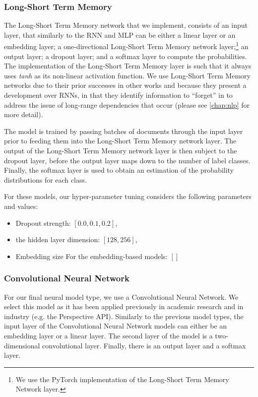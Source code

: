 \subsubsection{Long-Short Term Memory}

The Long-Short Term Memory network that we implement, consists of an input layer, that similarly to the RNN and MLP can be either a linear layer or an embedding layer; a one-directional Long-Short Term Memory network layer;\footnote{We use the PyTorch implementation of the Long-Short Term Memory Network layer.} an output layer; a dropout layer; and a softmax layer to compute the probabilities. The implementation of the Long-Short Term Memory layer is such that it always uses \textit{tanh} as its non-linear activation function. We use Long-Short Term Memory networks due to their prior successes in other works \cite{CITE: LSTM papers} and because they present a development over RNNs, in that they identify information to ``forget'' in to address the issue of long-range dependencies that occur (please see \autoref{chap:nlp} for more detail).

The model is trained by passing batches of documents through the input layer prior to feeding them into the Long-Short Term Memory network layer. The output of the Long-Short Term Memory network layer is then subject to the dropout layer, before the output layer maps down to the number of label classes. Finally, the softmax layer is used to obtain an estimation of the probability distributions for each class.

For these models, our hyper-parameter tuning considers the following parameters and values:

\begin{itemize}
  \item Dropout strength: $[0.0, 0.1, 0.2]$, 
  \item the hidden layer dimension: $[128, 256]$,
  \item Embedding size  For the embedding-based models: $[]$
\end{itemize}

\subsubsection{Convolutional Neural Network}

For our final neural model type, we use a Convolutional Neural Network. We select this model as it has been applied previously in academic research \cite{CITE: CNN papers} and in industry (e.g. the Perspective API). Similarly to the previous model types, the input layer of the Convolutional Neural Network models can either be an embedding layer or a linear layer. The second layer of the model is a two-dimensional convolutional layer. Finally, there is an output layer and a softmax layer. 

